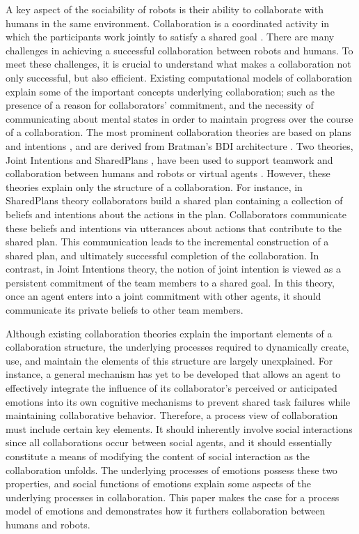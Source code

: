 A key aspect of the sociability of robots is their ability to collaborate with
humans in the same environment. Collaboration is a coordinated activity in which
the participants work jointly to satisfy a shared goal
\cite{grosz:plans-discourse}. There are many challenges in achieving a
successful collaboration between robots and humans. To meet these challenges, it
is crucial to understand what makes a collaboration not only successful, but
also efficient. Existing computational models of collaboration explain some of
the important concepts underlying collaboration; such as the presence of a
reason for collaborators' commitment, and the necessity of communicating about
mental states in order to maintain progress over the course of a collaboration.
The most prominent collaboration theories are based on plans and intentions
\cite{cohen:teamwork} \cite{grosz:plans-discourse}
\cite{Litman:discourse-commonsense}, and are derived from Bratman's BDI
architecture \cite{bratman:intentions-plans}. Two theories, Joint Intentions
\cite{cohen:teamwork} and SharedPlans
\cite{grosz:planning-acting,grosz:collaboration,grosz:plans-discourse}, have
been used to support teamwork and collaboration between humans and robots or
virtual agents \cite{breazeal:humanoid-robots}
\cite{montreuil:planning-robot-activity} \cite{sidner:enagagement-robot}
\cite{yen:cast}. However, these theories explain only the structure of a
collaboration. For instance, in SharedPlans theory collaborators build a shared
plan containing a collection of beliefs and intentions about the actions in the
plan. Collaborators communicate these beliefs and intentions via utterances
about actions that contribute to the shared plan. This communication leads to
the incremental construction of a shared plan, and ultimately successful
completion of the collaboration. In contrast, in Joint Intentions theory, the
notion of joint intention is viewed as a persistent commitment of the team
members to a shared goal. In this theory, once an agent enters into a joint
commitment with other agents, it should communicate its private beliefs to other
team members.

Although existing collaboration theories explain the important elements of a
collaboration structure, the underlying processes required to dynamically
create, use, and maintain the elements of this structure are largely
unexplained. For instance, a general mechanism has yet to be developed that
allows an agent to effectively integrate the influence of its collaborator's
perceived or anticipated emotions into its own cognitive mechanisms to prevent
shared task failures while maintaining collaborative behavior. Therefore, a
process view of collaboration must include certain key elements. It should
inherently involve social interactions since all collaborations occur between
social agents, and it should essentially constitute a means of modifying the
content of social interaction as the collaboration unfolds. The underlying
processes of emotions possess these two properties, and social functions of
emotions explain some aspects of the underlying processes in collaboration. This
paper makes the case for a process model of emotions and demonstrates how it
furthers collaboration between humans and robots.


